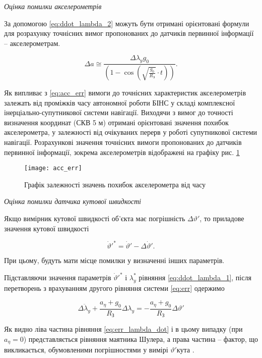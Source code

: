 \textit{Оцінка помилки акселерометрів}

За допомогою \eqref{eq:ddot_lambda_2} можуть бути отримані орієнтовані формули для розрахунку точнісних вимог пропонованих до датчиків первинної 
інформації -- акселерометрам.

\begin{equation} 
\label{eq:acc_err} 
\Delta a\cong \frac{\Delta \lambda _{y} g_{0} }{\left(1-\cos \left(\sqrt{\frac{g_{0} }{R_{{\text{З}}} } } \cdot t\right)\right)}.    
\end{equation} 

Як випливає з \eqref{eq:acc_err} вимоги до точнісних характеристик акселерометрів залежать від проміжків часу 
автономної роботи БІНС у складі комплексної інерціально-супутникової системи навігації. Виходячи з вимог до 
точності визначення координат (СКВ  5 м) отримані орієнтовані значення похибок акселерометра, у залежності 
від очікуваних перерв у роботі супутникової системи навігації. Розрахункові значення точнісних вимоги 
пропонованих до датчиків первинної інформації, зокрема акселерометрів відображені на графіку рис. \ref{fig:acc_err} 

\begin{figure}
\centering
\texttt{[image: acc\_err]}
\caption{Графік залежності значень похибок акселерометра від часу}
\label{fig:acc_err}
\end{figure} 
\vline 

\textit{Оцінка помилки датчика кутової швидкості}

Якщо вимірник кутової швидкості об'єкта має погрішність $\Delta \vartheta '$, то приладове значення кутової швидкості

\[\dot{\vartheta }'^{*} =\dot{\vartheta }'-\Delta \dot{\vartheta }'.\] 

При цьому, будуть мати місце помилки у визначенні інших параметрів.

Підставляючи значення параметрів $\dot{\vartheta }'^{*} $ і  $\lambda _{y}^{*} $ рівняння \eqref{eq:ddot_lambda_1},  після перетворень з врахуванням другого рівняння системи \eqref{eq:err} одержимо

\begin{equation} 
\label{eq:err_lambda_dot} 
\Delta \ddot{\lambda }_{y} +\frac{a_{\eta } +g_{0} }{R_{\text{З}} } \Delta \lambda _{y} =-\frac{a_{\eta } +g_{0} }{R_{\text{З}} } \Delta \vartheta ' 
\end{equation} 

Як видно ліва частина рівняння \eqref{eq:err_lambda_dot} і в цьому випадку (при $a_{\eta } =0$) представляється рівняння маятника Шулера, а права частина -- фактор, що викликається, обумовленими погрішностями у вимірі $\vartheta '$кута .

